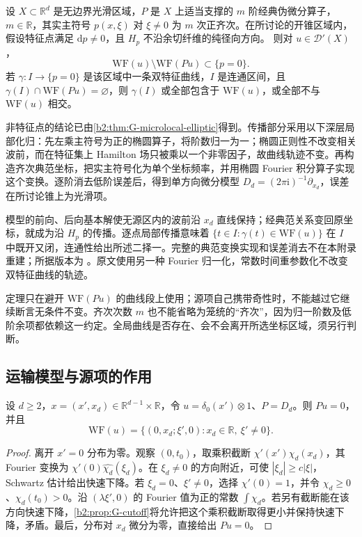 \begin{theorem}\label{b2:thm:G-propagation}
设 \(X\subset\mathbb R^d\) 是无边界光滑区域，\(P\) 是 \(X\) 上适当支撑的 \(m\) 阶经典伪微分算子，\(m\in\mathbb R\)，其实主符号 \(p(x,\xi)\) 对 \(\xi\ne0\) 为 \(m\) 次正齐次。在所讨论的开锥区域内，假设特征点满足 \(\mathrm dp\ne0\)，且 \(H_p\) 不沿余切纤维的纯径向方向。
则对 \(u\in\mathcal D'(X)\)，
\[
 \mathrm{WF}(u)\setminus\mathrm{WF}(Pu)\subset\{p=0\}.
\]
若 \(\gamma:I\to\{p=0\}\) 是该区域中一条双特征曲线，\(I\) 是连通区间，且 \(\gamma(I)\cap\mathrm{WF}(Pu)=\varnothing\)，则 \(\gamma(I)\) 或全部包含于 \(\mathrm{WF}(u)\)，或全部不与 \(\mathrm{WF}(u)\) 相交。
\end{theorem}
\begin{proofsketch}
非特征点的结论已由\cref{b2:thm:G-microlocal-elliptic}得到。传播部分采用以下深层局部化归：先左乘主符号为正的椭圆算子，将阶数归一为一；椭圆正则性不改变相关波前，而在特征集上 Hamilton 场只被乘以一个非零因子，故曲线轨迹不变。再构造齐次典范坐标，把实主符号化为单个坐标频率，并用椭圆 Fourier 积分算子实现这个变换。逐阶消去低阶误差后，得到单方向微分模型 \(D_d=(2\pi\mathrm i)^{-1}\partial_{x_d}\)，误差在所讨论锥上为光滑项。

模型的前向、后向基本解使无源区内的波前沿 \(x_d\) 直线保持；经典范关系变回原坐标，就成为沿 \(H_p\) 的传播。逐点局部传播意味着 \(\{t\in I:\gamma(t)\in\mathrm{WF}(u)\}\) 在 \(I\) 中既开又闭，连通性给出所述二择一。完整的典范变换实现和误差消去不在本附录重建；所据版本为 \cite[Section 6.1, Theorem 6.1.1, pp.~196--201]{DuistermaatHormander1972FIOII}。原文使用另一种 Fourier 归一化，常数时间重参数化不改变双特征曲线的轨迹。
\end{proofsketch}

定理只在避开 \(\mathrm{WF}(Pu)\) 的曲线段上使用；源项自己携带奇性时，不能越过它继续断言无条件不变。齐次次数 \(m\) 也不能省略为笼统的“齐次”，因为归一阶数及低阶余项都依赖这一约定。全局曲线是否存在、会不会离开所选坐标区域，须另行判断。

\subsection{运输模型与源项的作用}
\label{b2:subsec:G0602}

\begin{proposition}[横向点质量的运输]\label{b2:prop:G-transport-model}
设 \(d\ge2\)，\(x=(x',x_d)\in\mathbb R^{d-1}\times\mathbb R\)，令
\(u=\delta_0(x')\otimes1\)、\(P=D_d\)。则 \(Pu=0\)，并且
\[
 \mathrm{WF}(u)
 =\{(0,x_d;\xi',0):x_d\in\mathbb R,\ \xi'\ne0\}.
\]
\end{proposition}
\begin{proof}
离开 \(x'=0\) 分布为零。观察 \((0,t_0)\)，取乘积截断 \(\chi'(x')\chi_d(x_d)\)，其 Fourier 变换为
\(\chi'(0)\widehat{\chi_d}(\xi_d)\)。在 \(\xi_d\ne0\) 的方向附近，可使 \(|\xi_d|\ge c|\xi|\)，Schwartz 估计给出快速下降。若 \(\xi_d=0\)、\(\xi'\ne0\)，选择 \(\chi'(0)=1\)，并令 \(\chi_d\ge0\)、\(\chi_d(t_0)>0\)。沿 \((\lambda\xi',0)\) 的 Fourier 值为正的常数 \(\int\chi_d\)。若另有截断能在该方向快速下降，\cref{b2:prop:G-cutoff}将允许把这个乘积截断取得更小并保持快速下降，矛盾。最后，分布对 \(x_d\) 微分为零，直接给出 \(Pu=0\)。
\end{proof}

